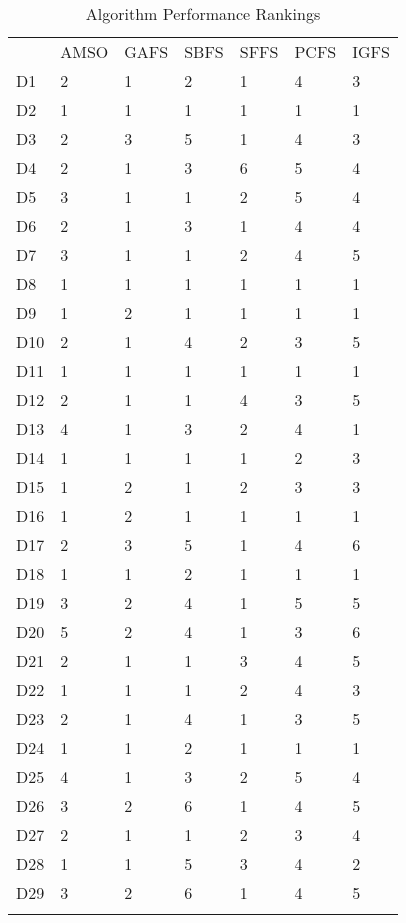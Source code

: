\begin{table}
\caption{Algorithm Performance Rankings}
\label{tbl:algorithm:rank}
\begin{tabular}{lllllll}
\noalign{\smallskip}\hline\noalign{\smallskip}
&AMSO&GAFS&SBFS&SFFS&PCFS&IGFS\\
\noalign{\smallskip}\hline
D1&2&1&2&1&4&3\\
D2&1&1&1&1&1&1\\
D3&2&3&5&1&4&3\\
D4&2&1&3&6&5&4\\
D5&3&1&1&2&5&4\\
D6&2&1&3&1&4&4\\
D7&3&1&1&2&4&5\\
D8&1&1&1&1&1&1\\
D9&1&2&1&1&1&1\\
D10&2&1&4&2&3&5\\
D11&1&1&1&1&1&1\\
D12&2&1&1&4&3&5\\
D13&4&1&3&2&4&1\\
D14&1&1&1&1&2&3\\
D15&1&2&1&2&3&3\\
D16&1&2&1&1&1&1\\
D17&2&3&5&1&4&6\\
D18&1&1&2&1&1&1\\
D19&3&2&4&1&5&5\\
D20&5&2&4&1&3&6\\
D21&2&1&1&3&4&5\\
D22&1&1&1&2&4&3\\
D23&2&1&4&1&3&5\\
D24&1&1&2&1&1&1\\
D25&4&1&3&2&5&4\\
D26&3&2&6&1&4&5\\
D27&2&1&1&2&3&4\\
D28&1&1&5&3&4&2\\
D29&3&2&6&1&4&5\\
\noalign{\smallskip}\hline
\end{tabular}
\end{table}
